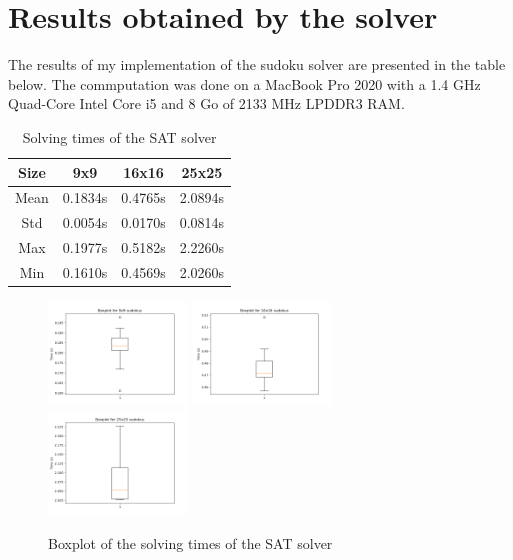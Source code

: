 \newpage
\section{Results obtained by the solver}

The results of my implementation of the sudoku solver are presented in the table below. 
The commputation was done on a MacBook Pro 2020 with a 1.4 GHz Quad-Core Intel Core i5 and 8 Go of 2133 MHz LPDDR3 RAM.

\begin{table}[!h]
  \centering
  \begin{tabular}{|c|c|c|c|}
  \hline
  Size & 9x9     & 16x16   & 25x25   \\ \hline
  Mean & 0.1834s & 0.4765s & 2.0894s \\ \hline
  Std  & 0.0054s & 0.0170s & 0.0814s  \\ \hline
  Max  & 0.1977s & 0.5182s & 2.2260s \\ \hline
  Min  & 0.1610s & 0.4569s & 2.0260s \\ \hline
  \end{tabular}
  \caption{Solving times of the SAT solver}
  \label{tab:results}
\end{table}

\begin{figure}[!h]
  \centering
  \includegraphics[width=0.33\textwidth]{figs/boxplot_9.png}
  \includegraphics[width=0.33\textwidth]{figs/boxplot_16.png}
  \includegraphics[width=0.33\textwidth]{figs/boxplot_25.png}
  \caption{Boxplot of the solving times of the SAT solver}
  \label{fig:boxplot}
\end{figure}

